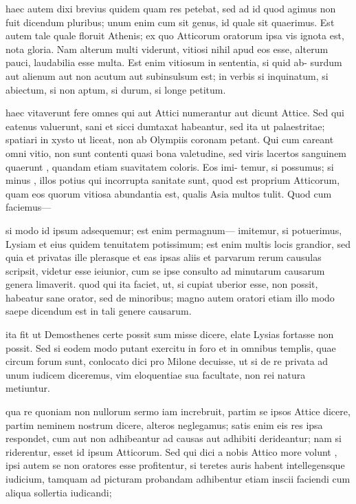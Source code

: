  haec autem dixi brevius quidem quam res petebat, sed ad id quod agimus non fuit dicendum pluribus; unum enim cum sit genus, id quale sit quaerimus. Est autem tale quale floruit Athenis; ex quo Atticorum oratorum ipsa vis ignota est, nota gloria. Nam alterum multi viderunt, vitiosi nihil apud eos esse, alterum pauci, laudabilia esse multa. Est enim vitiosum in sententia, si quid ab- surdum aut alienum aut non acutum aut subinsulsum est; in verbis si inquinatum, si abiectum, si non aptum, si durum, si longe petitum.

 haec vitaverunt fere omnes qui aut Attici numerantur aut dicunt Attice. Sed qui eatenus valuerunt, sani et sicci dumtaxat habeantur, sed ita ut palaestritae; spatiari in xysto ut liceat, non ab Olympiis coronam petant. Qui cum careant omni vitio, non sunt contenti quasi bona valetudine, sed viris lacertos sanguinem quaerunt , quandam etiam suavitatem coloris. Eos imi- temur, si possumus; si minus , illos potius qui incorrupta sanitate sunt, quod est proprium Atticorum, quam eos quorum vitiosa abundantia est, qualis Asia multos tulit. Quod cum faciemus—

 si modo id ipsum adsequemur; est enim permagnum— imitemur, si potuerimus, Lysiam et eius quidem tenuitatem potissimum; est enim multis locis grandior, sed quia et privatas ille plerasque et eas ipsas aliis et parvarum rerum causulas scripsit, videtur esse ieiunior, cum se ipse consulto ad minutarum causarum genera limaverit. quod qui ita faciet, ut, si cupiat uberior esse, non possit, habeatur sane orator, sed de minoribus; magno autem oratori etiam illo modo saepe dicendum est in tali genere causarum.

 ita fit ut Demosthenes certe possit sum misse dicere, elate Lysias fortasse non possit. Sed si eodem modo putant exercitu in foro et in omnibus templis, quae circum forum sunt, conlocato dici pro Milone decuisse, ut si de re privata ad unum iudicem diceremus, vim eloquentiae sua facultate, non rei natura metiuntur.

 qua re quoniam non nullorum sermo iam increbruit, partim se ipsos Attice dicere, partim neminem nostrum dicere, alteros neglegamus; satis enim eis res ipsa respondet, cum aut non adhibeantur ad causas aut adhibiti derideantur; nam si riderentur, esset id ipsum Atticorum. Sed qui dici a nobis Attico more volunt , ipsi autem se non oratores esse profitentur, si teretes auris habent intellegensque iudicium, tamquam ad picturam probandam adhibentur etiam inscii faciendi cum aliqua sollertia iudicandi;

